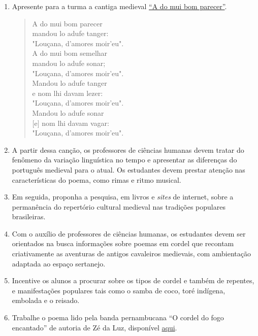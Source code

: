 \documentclass[12pt]{extarticle}
\begin{document}
\begin{enumerate}

\item Apresente para a turma a cantiga medieval \href{https://cantigas.fcsh.unl.pt/versaomusical.asp?cdcant=1307&cdvm=247}{``A do mui bom parecer''}.

\begin{verse}
A do mui bom parecer\\
mandou lo adufe tanger:\\
\quad "Louçana, d'amores moir'eu".\\
A do mui bom semelhar\\
mandou lo adufe sonar;\\
\quad "Louçana, d'amores moir'eu".\\
Mandou lo adufe tanger\\
e nom lhi davam lezer:\\
\quad "Louçana, d'amores moir'eu".\\
Mandou lo adufe sonar\\
$[$e$]$ nom lhi davam vagar:\\
\quad "Louçana, d'amores moir'eu".
\end{verse}

\item A partir dessa canção, os professores de ciências humanas devem tratar do fenômeno da variação linguística no tempo 
  e apresentar as diferenças do português medieval para o atual. Os estudantes devem prestar atenção 
  nas características do poema, como rimas e ritmo musical.
  
\item Em seguida, proponha a pesquisa, em livros e \emph{sites} de internet, sobre a
  permanência do repertório cultural medieval nas tradições populares
  brasileiras.

\item  Com o auxílio de professores de ciências humanas, os estudantes devem ser 
orientados na busca informações sobre poemas em
  cordel que recontam criativamente as
  aventuras de antigos cavaleiros medievais, com ambientação adaptada ao
  espaço sertanejo. 

\item Incentive os alunos a procurar sobre os tipos de cordel e também de 
repentes, e manifestações populares tais como 
o samba de coco, toré indígena, embolada e o reisado. 

\item Trabalhe o poema lido pela banda pernambucana ``O cordel do fogo encantado'' 
  de autoria de Zé da Luz, disponível \href{https://youtu.be/8NBauvFV6bo}{aqui}.


\end{enumerate}
\end{document}
